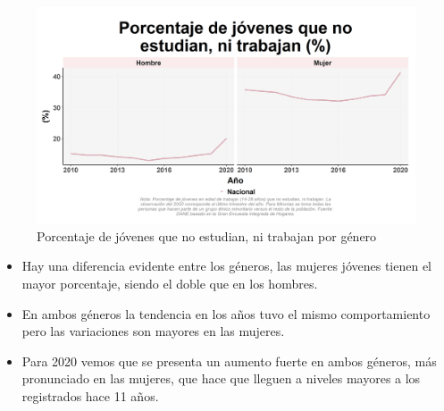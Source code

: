     \begin{figure}[H]
        \caption{Porcentaje de jóvenes que no estudian, ni trabajan por género \label{map_result_2} }
        \begin{center}
        \includegraphics[width=\textwidth,keepaspectratio]{img/var_41_trend.png}
        \end{center}
    \end{figure}
            \begin{itemize}
                \item Hay una diferencia evidente entre los géneros, las mujeres jóvenes tienen el mayor porcentaje, siendo el doble que en los hombres.
                \item En ambos géneros la tendencia en los años tuvo el mismo comportamiento pero las variaciones son mayores en las mujeres.
                \item Para 2020 vemos que se presenta un aumento fuerte en ambos géneros, más pronunciado en las mujeres, que hace que lleguen a niveles mayores a los registrados hace 11 años.
                \end{itemize}

